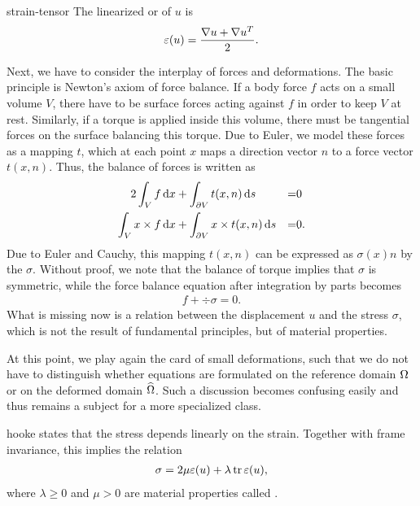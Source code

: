 \begin{Definition}{strain-tensor}
  The linearized  or 
  of $u$ is
  \begin{gather}
    \varepsilon(u) = \frac{\nabla u + \nabla u^T}2.
  \end{gather}
\end{Definition}

\begin{intro}
  Next, we have to consider the interplay of forces and
  deformations. The basic principle is Newton's axiom of force
  balance. If a body force $f$ acts on a small volume $V$, there have
  to be surface forces acting against $f$ in order to keep $V$ at
  rest. Similarly, if a torque is applied inside this volume, there
  must be tangential forces on the surface balancing this torque. Due
  to Euler, we model these forces as a mapping $t$, which at each
  point $x$ maps a direction vector $n$ to a force vector
  $t(x,n)$. Thus, the balance of forces is written as
  \begin{alignat*}2
    \int_V f \dx &+ \int_{\d V} t(x,n) \ds &=&0\\
    \int_V x\times f \dx &+ \int_{\d V} x\times t(x,n) \ds &=&0.
  \end{alignat*}
  Due to Euler and Cauchy, this mapping $t(x,n)$ can be expressed as
  $\sigma(x)n$ by the  $\sigma$. Without proof,
  we note that the balance of torque implies that $\sigma$ is
  symmetric, while the force balance equation after integration by
  parts becomes
  \begin{gather}
    \label{eq:mixedintro:3}
    f + \div \sigma = 0.
  \end{gather}
  What is missing now is a relation between the displacement $u$ and
  the stress $\sigma$, which is not the result of fundamental
  principles, but of material properties.
\end{intro}

\begin{remark}
  At this point, we play again the card of small deformations, such
  that we do not have to distinguish whether equations are formulated
  on the reference domain $\Omega$ or on the deformed domain
  $\widehat{\Omega}$. Such a discussion becomes confusing easily and
  thus remains a subject for a more specialized class.
\end{remark}

\begin{Definition}{hooke}
   states that the stress depends linearly on the
  strain. Together with frame invariance, this implies the relation
  \begin{gather}
    \label{eq:mixedintro:4}
    \sigma = 2\mu \varepsilon(u) + \lambda \operatorname{tr} \varepsilon(u),
  \end{gather}
  where $\lambda\ge 0$ and $\mu> 0$ are material properties called
  .
\end{Definition}

